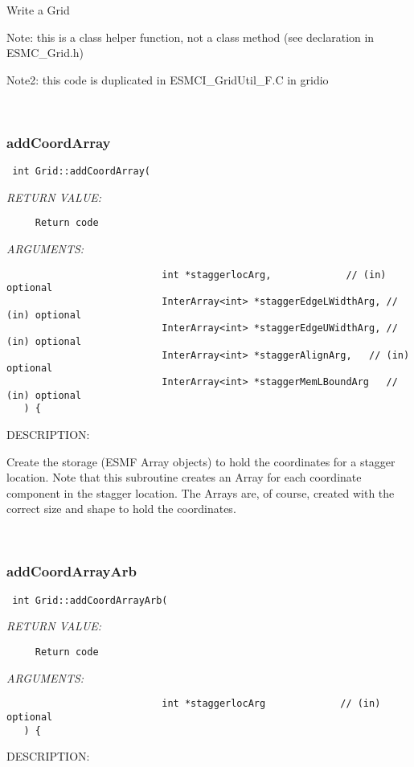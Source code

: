         Write a Grid
  
        Note: this is a class helper function, not a class method
        (see declaration in ESMC\_Grid.h)
  
        Note2:  this code is duplicated in ESMCI_GridUtil_F.C in gridio
   
 
\mbox{}\hrulefill\ 
 
\subsubsection [addCoordArray] {addCoordArray}


  
\begin{verbatim} int Grid::addCoordArray(
 \end{verbatim}{\em RETURN VALUE:}
\begin{verbatim}     Return code\end{verbatim}{\em ARGUMENTS:}
\begin{verbatim}                           int *staggerlocArg,             // (in) optional
                           InterArray<int> *staggerEdgeLWidthArg, // (in) optional
                           InterArray<int> *staggerEdgeUWidthArg, // (in) optional
                           InterArray<int> *staggerAlignArg,   // (in) optional 
                           InterArray<int> *staggerMemLBoundArg   // (in) optional 
   ) {\end{verbatim}
{\sf DESCRIPTION:\\ }


     Create the storage (ESMF Array objects) to hold the coordinates for a
   stagger location. Note that this subroutine creates an Array for each 
   coordinate component in the stagger location. The Arrays are, of course,
   created with the correct size and shape to hold the coordinates.  
 
\mbox{}\hrulefill\ 
 
\subsubsection [addCoordArrayArb] {addCoordArrayArb}


  
\begin{verbatim} int Grid::addCoordArrayArb(
 \end{verbatim}{\em RETURN VALUE:}
\begin{verbatim}     Return code\end{verbatim}{\em ARGUMENTS:}
\begin{verbatim}                           int *staggerlocArg             // (in) optional
   ) {\end{verbatim}
{\sf DESCRIPTION:\\ }


